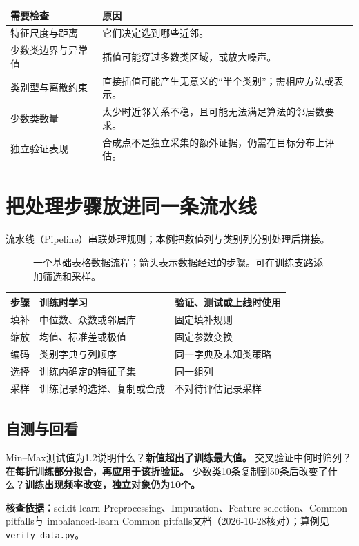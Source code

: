 \begin{center}
\begin{tabularx}{\textwidth}{P{37mm}Y}
\toprule
需要检查 & 原因\\
\midrule
特征尺度与距离 & 它们决定选到哪些近邻。\\
少数类边界与异常值 & 插值可能穿过多数类区域，或放大噪声。\\
类别型与离散约束 & 直接插值可能产生无意义的“半个类别”；需相应方法或表示。\\
少数类数量 & 太少时近邻关系不稳，且可能无法满足算法的邻居数要求。\\
独立验证表现 & 合成点不是独立采集的额外证据，仍需在目标分布上评估。\\
\bottomrule
\end{tabularx}
\end{center}


\section{把处理步骤放进同一条流水线}
\label{sec:data-pipeline}
流水线（Pipeline）串联处理规则；本例把数值列与类别列分别处理后拼接。

\begin{figure}[htbp]
\centering
\caption{一个基础表格数据流程；箭头表示数据经过的步骤。可在训练支路添加筛选和采样。}
\par\smallskip
{}
\end{figure}

\begin{center}
\begin{tabularx}{\textwidth}{P{32mm}YY}
\toprule
步骤 & 训练时学习 & 验证、测试或上线时使用\\
\midrule
填补 & 中位数、众数或邻居库 & 固定填补规则\\
缩放 & 均值、标准差或极值 & 固定参数变换\\
编码 & 类别字典与列顺序 & 同一字典及未知类策略\\
选择 & 训练内确定的特征子集 & 同一组列\\
采样 & 训练记录的选择、复制或合成 & 不对待评估记录采样\\
\bottomrule
\end{tabularx}
\end{center}

\subsection{自测与回看}
Min--Max测试值为1.2说明什么？\textbf{新值超出了训练最大值。}
交叉验证中何时筛列？\textbf{在每折训练部分拟合，再应用于该折验证。}
少数类10条复制到50条后改变了什么？\textbf{训练出现频率改变，独立对象仍为10个。}

\smallskip
\begingroup\small
\noindent\textbf{核查依据：}scikit-learn Preprocessing、Imputation、Feature selection、Common pitfalls与
imbalanced-learn Common pitfalls文档（2026-10-28核对）；算例见\texttt{verify\_data.py}。
\par\endgroup
